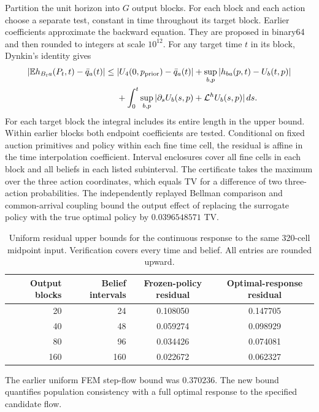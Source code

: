 Partition the unit horizon into $G$ output blocks. For each block
and each action choose a separate test, constant in time throughout its
target block. Earlier coefficients approximate the backward equation.
They are proposed in binary64 and then rounded to integers at scale
$10^{12}$. For any target time $t$ in its block, Dynkin's identity gives
\begin{align*}
 |\mathbb E h_{B_ta}(P_t,t)-\bar q_a(t)| \leq {}&
 |U_4(0,p_{\rm prior})-\bar q_a(t)|
  +\sup_{b,p}|h_{ba}(p,t)-U_b(t,p)|\\
 &+\int_0^t\sup_{b,p}|\partial_s U_b(s,p)+\mathcal L^h U_b(s,p)|\,ds.
\end{align*}
For each target block the integral includes its entire length in the upper
bound. Within earlier blocks both endpoint coefficients are tested.
Conditional on fixed auction primitives and policy within each fine
time cell, the residual is affine in the time interpolation coefficient.
Interval enclosures cover all fine cells in each block and all beliefs
in each listed subinterval. The certificate takes the maximum over the three
action coordinates, which equals TV for a difference of two three-action
probabilities. The independently replayed Bellman comparison and
common-arrival coupling bound the output effect of replacing the surrogate
policy with the true optimal policy by $0.0396548571$ TV.

\begin{table}[htbp]\centering\small
\caption{Uniform residual upper bounds for the continuous response to the
same 320-cell midpoint input. Verification covers every time and belief.
All entries are rounded upward.}\label{tab:cg-dual}
\begin{tabular}{@{}rrcc@{}}\toprule
Output blocks & Belief intervals & Frozen-policy residual & Optimal-response residual\\\midrule
20 & 24 & 0.108050 & 0.147705\\
40 & 48 & 0.059274 & 0.098929\\
80 & 96 & 0.034426 & 0.074081\\
160 & 160 & 0.022672 & 0.062327\\\bottomrule
\end{tabular}
\end{table}
The earlier uniform FEM step-flow bound was $0.370236$.
The new bound quantifies population consistency with a full optimal
response to the specified candidate flow.

\CGpage
